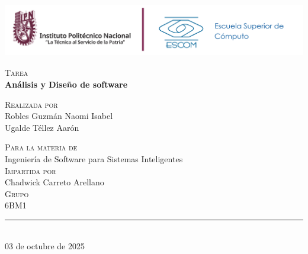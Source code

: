 \begin{titlepage}
  \thispagestyle{empty}
  \pagecolor{white}
  
  \begin{center}
    \vspace{1cm}
    
   
      \centering
          \vspace{2cm}
      \includegraphics[height=2.35cm]{img/logos.png}
    
    \vspace{3cm}
    
    {\normalsize\color{charcoal}\textsc{Tarea}}\\[0.5cm]
    
    {\huge\bfseries\color{black}Análisis y Diseño de software}\\[0.5cm]

    
    \vspace{1.5cm}
    
    {\small\color{charcoal}\textsc{Realizada por}}\\[0.3cm]
    
    {\normalsize\color{black}Robles Guzmán Naomi Isabel}\\[0.2cm]
    {\normalsize\color{black}Ugalde Téllez Aarón}\\[0.5cm]

    
    \vspace{0.8cm}
    
    {\small\color{charcoal}\textsc{Para la materia de}}\\[0.2cm]
    {\normalsize\color{blue}Ingeniería de Software para Sistemas Inteligentes}\\[0.5cm]
    
    {\small\color{charcoal}\textsc{Impartida por}}\\[0.2cm]
    {\normalsize\color{black}Chadwick Carreto Arellano}\\[0.5cm]
    
    {\small \color{charcoal}\textsc{Grupo}}\\[0.3cm]
    {\normalsize\color{black}6BM1}\\[0.8cm]
    
    \vfill
    
    {\color{blue}\rule{0.4\textwidth}{1pt}}\\[0.3cm]
    {\large\color{charcoal}03 de octubre de 2025}
    
    \vspace{1cm}
    
  \end{center}
\end{titlepage}